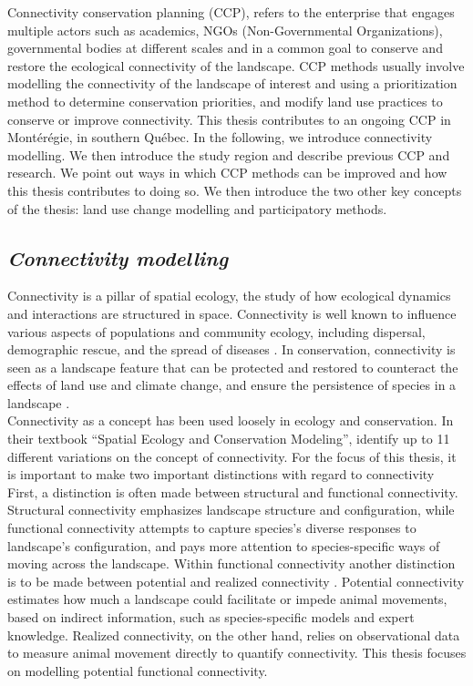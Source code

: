 \documentclass[12pt,Bold,TexShade]{thesis/mcgilletdclass}
\begin{document}
{Connectivity conservation planning (CCP), refers to the enterprise that engages multiple actors such as academics, NGOs (Non-Governmental Organizations), governmental bodies at different scales and in a common goal to conserve and restore the ecological connectivity of the landscape. CCP methods usually involve modelling the connectivity of the landscape of interest and using a prioritization method to determine conservation priorities, and modify land use practices to conserve or improve connectivity. This thesis  contributes to an ongoing CCP in Montérégie, in southern Québec. In the following, we introduce connectivity modelling. We then introduce the study region and describe previous CCP and research. We point out ways in which CCP methods can be improved and how this thesis contributes to doing so. We then introduce the two other key concepts of the thesis: land use change modelling and participatory methods. \\ \vspace{2em}

\subsection*{\textit{Connectivity modelling \\ \vspace{1em}}}

Connectivity is a pillar of spatial ecology, the study of how ecological dynamics and interactions are structured in space. Connectivity is well known to influence various aspects of populations and community ecology, including dispersal, demographic rescue, and the spread of diseases \citep{krosby_ecological_2010-1, crook_human_2015}. In conservation, connectivity is seen as a landscape feature that can be protected and restored to counteract the effects of  land use and climate change, and ensure the persistence of species in a landscape \citep{costanza_landscape_2019}. \\

Connectivity as a concept has been used loosely in ecology and conservation. In their textbook “Spatial Ecology and Conservation Modeling”, \cite{fletcher_spatial_2018} identify up to 11 different variations on the concept of connectivity. For the focus of this thesis, it is important to make two important distinctions with regard to connectivity First, a distinction is often made between structural and functional connectivity. Structural connectivity emphasizes landscape structure and configuration, while functional connectivity attempts to capture species’s diverse responses to landscape’s configuration, and pays more attention to species-specific ways of moving across the landscape. Within functional connectivity another distinction is to be made between potential and realized connectivity \citep{calabrese_comparison_2004}. Potential connectivity estimates how much a landscape could facilitate or impede animal movements, based on indirect information, such as species-specific models and expert knowledge. Realized connectivity, on the other hand, relies on observational data to measure animal movement directly to quantify connectivity. This thesis focuses on modelling potential functional connectivity. \\

}
\end{document}
